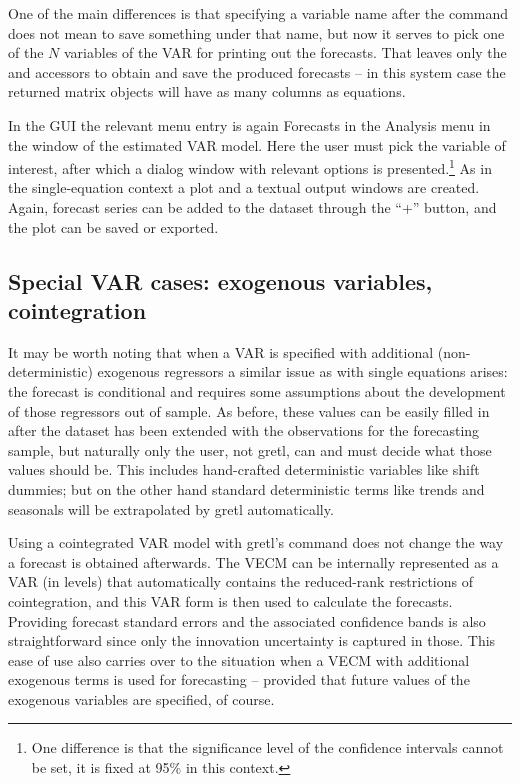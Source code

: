 One of the main differences is that specifying a variable name after the
 command does not mean to save something under that name, but 
now it serves to pick one of the $N$ variables of the VAR for printing
out the forecasts. That leaves only the  and 
accessors to obtain and save the produced forecasts -- in this system 
case the returned matrix objects will have as many columns as equations.

In the GUI the relevant menu entry is again Forecasts in the Analysis 
menu in the window of the estimated VAR model. Here the user must pick
the variable of interest, after which a dialog window with relevant 
options is presented.\footnote{One difference is that the significance
level of the confidence intervals cannot be set, it is fixed at 95\% in
this context.} As in the single-equation context a plot and a textual
output windows are created. Again, forecast series can be added to the 
dataset through the ``+'' button, and the plot can be saved or exported.

\subsection{Special VAR cases: exogenous variables, cointegration}

It may be worth noting that when a VAR is specified with additional
(non-deterministic) exogenous regressors a similar issue as with single
equations arises: the forecast is conditional and requires some
assumptions about the development of those regressors out of sample.
 As before, these values
can be easily filled in after the dataset has been extended with the
observations for the forecasting sample, but naturally only the user,
not gretl, can and must decide what those values should be. This 
includes hand-crafted deterministic variables like shift dummies; but
on the other hand standard deterministic terms like trends and
seasonals will be extrapolated by gretl automatically.

Using a cointegrated VAR model with gretl's  command does not
change the way a forecast is obtained afterwards. The VECM can be 
internally represented as a VAR (in levels) that automatically contains
the reduced-rank restrictions of cointegration, and this VAR form is
then used to calculate the forecasts. Providing forecast standard errors
and the associated confidence bands is also straightforward since only
the innovation uncertainty is captured in those. This ease of use also
carries over to the situation when a VECM with additional exogenous
terms is used for forecasting -- provided that future values of
the exogenous variables are specified, of course.   

